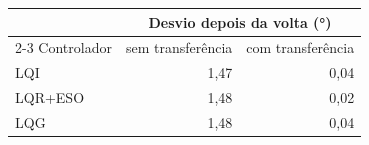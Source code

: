 \begin{tabular}{lrr}
\toprule
 & \multicolumn{2}{c}{Desvio depois da volta (\si{\degree})} \\
\cmidrule(lr){2-3}
Controlador & sem transferência & com transferência \\
\midrule
LQI & 1,47 & 0,04 \\
LQR+ESO & 1,48 & 0,02 \\
LQG & 1,48 & 0,04 \\
\bottomrule
\end{tabular}
